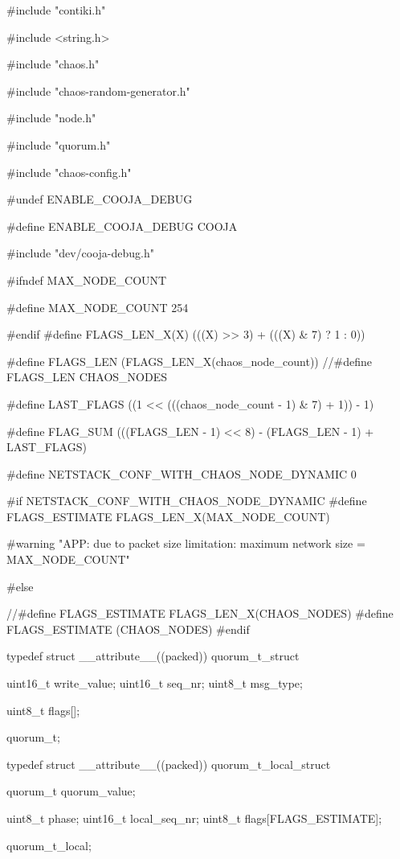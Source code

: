 #include "contiki.h"

#include <string.h>



#include "chaos.h"

#include "chaos-random-generator.h"

#include "node.h"

#include "quorum.h"

#include "chaos-config.h"



#undef ENABLE_COOJA_DEBUG

#define ENABLE_COOJA_DEBUG COOJA

#include "dev/cooja-debug.h"



#ifndef MAX_NODE_COUNT

#define MAX_NODE_COUNT 254

#endif
#define FLAGS_LEN_X(X)   (((X) >> 3) + (((X) & 7) ? 1 : 0))

#define FLAGS_LEN   (FLAGS_LEN_X(chaos_node_count))
//#define FLAGS_LEN CHAOS_NODES

#define LAST_FLAGS  ((1 << (((chaos_node_count - 1) & 7) + 1)) - 1)


#define FLAG_SUM    (((FLAGS_LEN - 1) << 8) - (FLAGS_LEN - 1) + LAST_FLAGS)


#define NETSTACK_CONF_WITH_CHAOS_NODE_DYNAMIC 0

#if NETSTACK_CONF_WITH_CHAOS_NODE_DYNAMIC
#define FLAGS_ESTIMATE FLAGS_LEN_X(MAX_NODE_COUNT)

#warning "APP: due to packet size limitation: maximum network size = MAX_NODE_COUNT"

#else

//#define FLAGS_ESTIMATE FLAGS_LEN_X(CHAOS_NODES)
#define FLAGS_ESTIMATE (CHAOS_NODES)
#endif





typedef struct __attribute__((packed)) quorum_t_struct {

  uint16_t write_value;
  uint16_t seq_nr;
  uint8_t msg_type;

  uint8_t flags[];

} quorum_t;

typedef struct __attribute__((packed)) quorum_t_local_struct {

  quorum_t quorum_value;

  uint8_t phase;
  uint16_t local_seq_nr;
  uint8_t flags[FLAGS_ESTIMATE];

} quorum_t_local;



